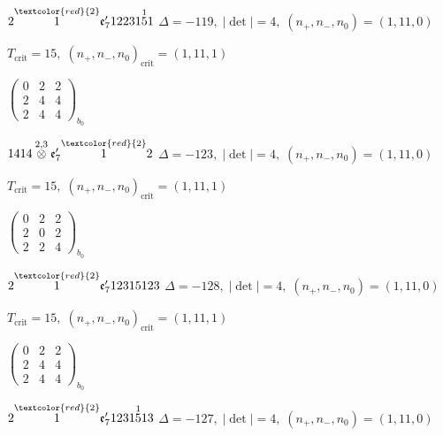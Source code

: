 \documentclass[10pt]{article}
\begin{document}
\smallskip

$2\overset{\textcolor{red}{2}}{1}\mathfrak{e}_7'12231\overset{1}{5}1$ \quad $\Delta=-119,\; |\det|=4,\; (n_+,n_-,n_0)=(1,11,0)$

\hspace{1em}$T_{\text{crit}}=15,\; (n_+,n_-,n_0)_{\text{crit}}=(1,11,1)$

\hspace{2em}$\left(\begin{smallmatrix}0 & 2 & 2 \\ 2 & 4 & 4 \\ 2 & 4 & 4\end{smallmatrix}\right)_{\!b_0}$

\smallskip

$1414\overset{2,3}{\otimes}\mathfrak{e}_7'\overset{\textcolor{red}{2}}{1}2$ \quad $\Delta=-123,\; |\det|=4,\; (n_+,n_-,n_0)=(1,11,0)$

\hspace{1em}$T_{\text{crit}}=15,\; (n_+,n_-,n_0)_{\text{crit}}=(1,11,1)$

\hspace{2em}$\left(\begin{smallmatrix}0 & 2 & 2 \\ 2 & 0 & 2 \\ 2 & 2 & 4\end{smallmatrix}\right)_{\!b_0}$

\smallskip

$2\overset{\textcolor{red}{2}}{1}\mathfrak{e}_7'12315123$ \quad $\Delta=-128,\; |\det|=4,\; (n_+,n_-,n_0)=(1,11,0)$

\hspace{1em}$T_{\text{crit}}=15,\; (n_+,n_-,n_0)_{\text{crit}}=(1,11,1)$

\hspace{2em}$\left(\begin{smallmatrix}0 & 2 & 2 \\ 2 & 4 & 4 \\ 2 & 4 & 4\end{smallmatrix}\right)_{\!b_0}$

\smallskip

$2\overset{\textcolor{red}{2}}{1}\mathfrak{e}_7'1231\overset{1}{5}13$ \quad $\Delta=-127,\; |\det|=4,\; (n_+,n_-,n_0)=(1,11,0)$
\end{document}
